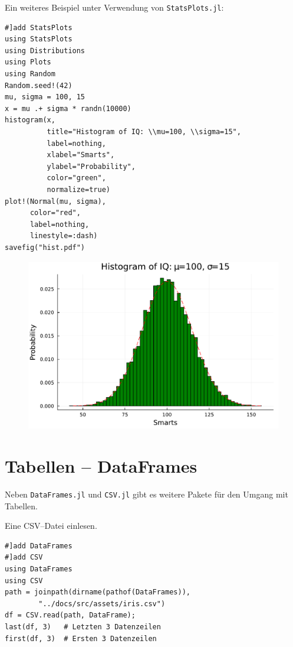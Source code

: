 \documentclass[10pt,twocolumn]{scrartcl}
\begin{document}
Ein weiteres Beispiel unter Verwendung von \lstinline|StatsPlots.jl|:
\begin{lstlisting}
#]add StatsPlots
using StatsPlots
using Distributions
using Plots
using Random
Random.seed!(42)
mu, sigma = 100, 15
x = mu .+ sigma * randn(10000)
histogram(x,
          title="Histogram of IQ: \\mu=100, \\sigma=15",
          label=nothing,
          xlabel="Smarts",
          ylabel="Probability",
          color="green",
          normalize=true)
plot!(Normal(mu, sigma),
      color="red",
      label=nothing,
      linestyle=:dash)
savefig("hist.pdf")
\end{lstlisting}

\begin{figure}[h]
\centering
\includegraphics[width=.95\columnwidth]{hist.pdf}
\end{figure}

\section{Tabellen -- DataFrames}
\label{sec:dataFrame}

Neben \lstinline|DataFrames.jl| und \lstinline|CSV.jl| gibt es weitere Pakete
für den Umgang mit Tabellen.

Eine CSV--Datei einlesen.
\begin{lstlisting}
#]add DataFrames
#]add CSV
using DataFrames
using CSV
path = joinpath(dirname(pathof(DataFrames)),
        "../docs/src/assets/iris.csv")
df = CSV.read(path, DataFrame);
last(df, 3)   # Letzten 3 Datenzeilen
first(df, 3)  # Ersten 3 Datenzeilen
\end{lstlisting}
\end{document}
